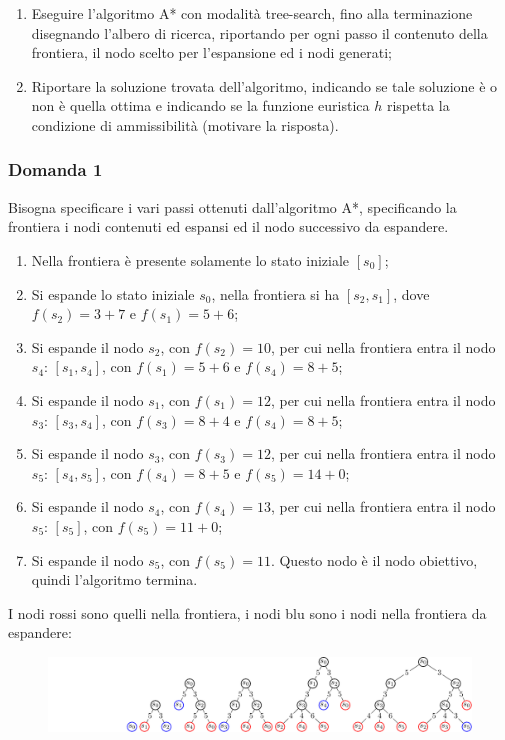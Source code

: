 \documentclass{article}
\numberwithin{equation}{section}
\begin{document}
\begin{enumerate}
    \item Eseguire l'algoritmo A* con modalità tree-search, fino alla terminazione disegnando l'albero di ricerca, riportando per ogni passo il 
contenuto della frontiera, il nodo scelto per l'espansione ed i nodi generati;
    \item Riportare la soluzione trovata dell'algoritmo, indicando se tale soluzione è o non è quella ottima e indicando se la funzione euristica 
$h$ rispetta la condizione di ammissibilità (motivare la risposta). 
\end{enumerate}

\subsubsection*{Domanda 1}

Bisogna specificare i vari passi ottenuti dall'algoritmo A*, specificando la frontiera i nodi contenuti ed espansi ed il nodo successivo 
da espandere.

\begin{enumerate}
    \item Nella frontiera è presente solamente lo stato iniziale $[s_0]$;
    \item Si espande lo stato iniziale $s_0$, nella frontiera si ha $[s_2,s_1]$, dove $f(s_2)=3+7$ e $f(s_1)=5+6$;
    \item Si espande il nodo $s_2$, con $f(s_2)=10$, per cui nella frontiera entra il nodo $s_4$: $[s_1,s_4]$, con $f(s_1)=5+6$ e $f(s_4)=8+5$;
    \item Si espande il nodo $s_1$, con $f(s_1)=12$, per cui nella frontiera entra il nodo $s_3$: $[s_3, s_4]$, con $f(s_3)=8+4$ e $f(s_4)=8+5$;
    \item Si espande il nodo $s_3$, con $f(s_3)=12$, per cui nella frontiera entra il nodo $s_5$: $[s_4, s_5]$, con $f(s_4)=8+5$ e $f(s_5)=14+0$;
    \item Si espande il nodo $s_4$, con $f(s_4)=13$, per cui nella frontiera entra il nodo $s_5$: $[s_5]$, con $f(s_5)=11+0$;
    \item Si espande il nodo $s_5$, con $f(s_5)=11$. Questo nodo è il nodo obiettivo, quindi l'algoritmo termina. 
\end{enumerate}

I nodi rossi sono quelli nella frontiera, i nodi blu sono i nodi nella frontiera da espandere:

\begin{figure}[H]%
    \centering%
    \includegraphics[trim={3.9cm 0 0 0}, scale=0.95]{albero_esercitazione_1.pdf}%
\end{figure}
\end{document}
